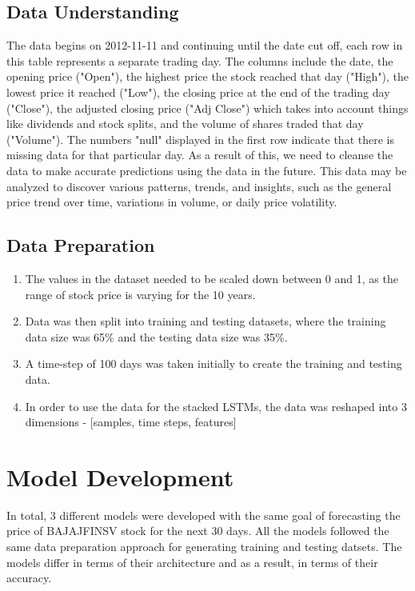\documentclass[12pt]{article}
\begin{document}
\subsection{Data Understanding}

\normalsize{The data begins on 2012-11-11 and continuing until the date cut off, each row in this table represents a separate trading day. The columns include the date, the opening price ("Open"), the highest price the stock reached that day ("High"), the lowest price it reached ("Low"), the closing price at the end of the trading day ("Close"), the adjusted closing price ("Adj Close") which takes into account things like dividends and stock splits, and the volume of shares traded that day ("Volume"). The numbers "null" displayed in the first row indicate that there is missing data for that particular day. As a result of this, we need to cleanse the data to make accurate predictions using the data in the future. This data may be analyzed to discover various patterns, trends, and insights, such as the general price trend over time, variations in volume, or daily price volatility. }
\subsection{Data Preparation}
\begin{enumerate}
    \item The values in the dataset needed to be scaled down between 0 and 1, as the range of stock price is varying for the 10 years.
    \item  Data was then split into training and testing datasets, where the training data size was 65\% and the testing data size was 35\%. 
    \item A time-step of 100 days was taken initially to create the training and testing data.
    \item In order to use the data for the stacked LSTMs, the data was reshaped into 3 dimensions - [samples, time steps, features]
\end{enumerate}



\section{Model Development}
\normalsize{In total, 3 different models were developed with the same goal of forecasting the price of BAJAJFINSV stock for the next 30 days. All the models followed the same data preparation approach for generating training and testing datsets. The models differ in terms of their architecture and as a result, in terms of their accuracy.}
\\
\end{document}
